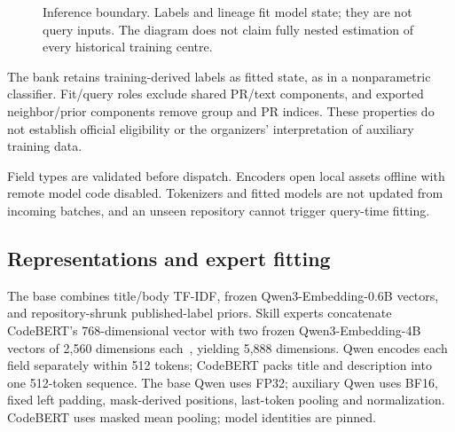 \documentclass[10pt,conference]{IEEEtran}
\begin{document}
\begin{figure}[t]
\centering
{}
\caption{Inference boundary. Labels and lineage fit model state; they are not query inputs. The diagram does not claim fully nested estimation of every historical training centre.}
\label{fig:boundary}
\end{figure}

The bank retains training-derived labels as fitted state, as in a nonparametric classifier. Fit/query roles exclude shared PR/text components, and exported neighbor/prior components remove group and PR indices. These properties do not establish official eligibility or the organizers' interpretation of auxiliary training data.

Field types are validated before dispatch. Encoders open local assets offline with remote model code disabled. Tokenizers and fitted models are not updated from incoming batches, and an unseen repository cannot trigger query-time fitting.

\subsection{Representations and expert fitting}
The base combines title/body TF-IDF, frozen Qwen3-Embedding-0.6B vectors, and repository-shrunk published-label priors. Skill experts concatenate CodeBERT's 768-dimensional vector with two frozen Qwen3-Embedding-4B vectors of 2,560 dimensions each~\cite{codebert,qwen}, yielding 5,888 dimensions. Qwen encodes each field separately within 512 tokens; CodeBERT packs title and description into one 512-token sequence. The base Qwen uses FP32; auxiliary Qwen uses BF16, fixed left padding, mask-derived positions, last-token pooling and normalization. CodeBERT uses masked mean pooling; model identities are pinned.
\end{document}
